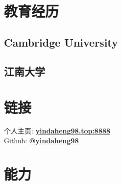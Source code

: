 \documentclass[]{deedy-resume-openfont}
\begin{document}
%
%

%
%

%
%

\begin{minipage}[t]{0.25\textwidth}


	\section{教育经历}
    \subsection{Cambridge University}
    \sectionsep
	\subsection{江南大学}
    \sectionsep
    

	\section{链接}
	个人主页:  \href{http://yindaheng98.top:8888}{\bf yindaheng98.top:8888} \\
	Github: \href{https://github.com/yindaheng98}{\bf \newline @yindaheng98} \\
	\sectionsep




	\section{能力}

\end{minipage}
\end{document}
